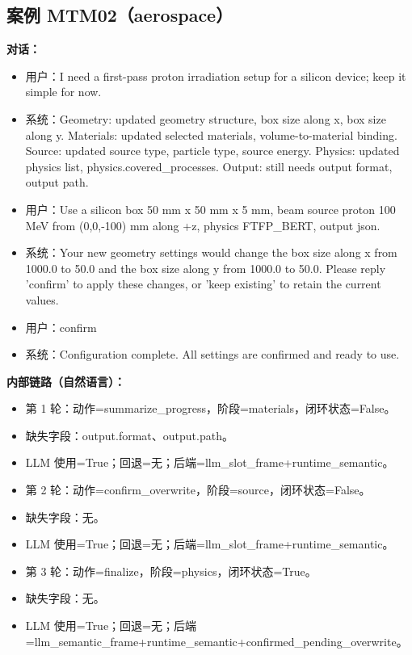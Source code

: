\documentclass[11pt]{ctexart}
\begin{document}
\subsection{案例 MTM02（aerospace）}
\textbf{对话：}
\begin{itemize}
\item 用户：I need a first-pass proton irradiation setup for a silicon device; keep it simple for now.
\item 系统：Geometry: updated geometry structure, box size along x, box size along y. Materials: updated selected materials, volume-to-material binding. Source: updated source type, particle type, source energy. Physics: updated physics list, physics.covered\_processes. Output: still needs output format, output path.
\item 用户：Use a silicon box 50 mm x 50 mm x 5 mm, beam source proton 100 MeV from (0,0,-100) mm along +z, physics FTFP\_BERT, output json.
\item 系统：Your new geometry settings would change the box size along x from 1000.0 to 50.0 and the box size along y from 1000.0 to 50.0. Please reply 'confirm' to apply these changes, or 'keep existing' to retain the current values.
\item 用户：confirm
\item 系统：Configuration complete. All settings are confirmed and ready to use.
\end{itemize}
\textbf{内部链路（自然语言）：}
\begin{itemize}
\item 第 1 轮：动作=summarize\_progress，阶段=materials，闭环状态=False。
\item 缺失字段：output.format、output.path。
\item LLM 使用=True；回退=无；后端=llm\_slot\_frame+runtime\_semantic。
\item 第 2 轮：动作=confirm\_overwrite，阶段=source，闭环状态=False。
\item 缺失字段：无。
\item LLM 使用=True；回退=无；后端=llm\_slot\_frame+runtime\_semantic。
\item 第 3 轮：动作=finalize，阶段=physics，闭环状态=True。
\item 缺失字段：无。
\item LLM 使用=True；回退=无；后端=llm\_semantic\_frame+runtime\_semantic+confirmed\_pending\_overwrite。
\end{itemize}
\end{document}
